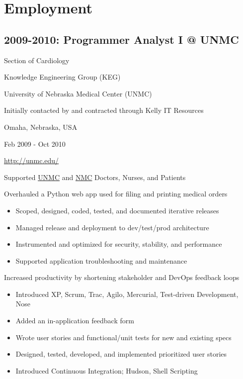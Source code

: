 \documentclass[letter,,openany,oneside]{sphinxhowto}
\begin{document}
\section{Employment}
\label{resume:employment}

\subsection{2009-2010: Programmer Analyst I @ UNMC}
\label{resume:programmer-analyst-i-unmc}
\begin{DUlineblock}{0em}
\item[] Section of Cardiology
\item[] Knowledge Engineering Group (KEG)
\item[] University of Nebraska Medical Center (UNMC)
\item[] Initially contacted by and contracted through Kelly IT Resources
\item[] Omaha, Nebraska, USA
\item[] Feb 2009 - Oct 2010
\item[] \url{http://unmc.edu/}
\end{DUlineblock}

Supported \href{https://en.wikipedia.org/wiki/University\_of\_Nebraska\_Medical\_Center}{UNMC}
and \href{https://en.wikipedia.org/wiki/Nebraska\_Medical\_Center}{NMC}
Doctors, Nurses, and Patients

Overhauled a Python web app used for filing and printing medical orders
\begin{itemize}
\item {} 
Scoped, designed, coded, tested, and documented iterative releases

\item {} 
Managed release and deployment to dev/test/prod architecture

\item {} 
Instrumented and optimized for security, stability, and performance

\item {} 
Supported application troubleshooting and maintenance

\end{itemize}

Increased productivity by shortening stakeholder and DevOps feedback loops
\begin{itemize}
\item {} 
Introduced XP, Scrum, Trac, Agilo, Mercurial, Test-driven Development, Nose

\item {} 
Added an in-application feedback form

\item {} 
Wrote user stories and functional/unit tests for new and existing specs

\item {} 
Designed, tested, developed, and implemented prioritized user stories

\item {} 
Introduced Continuous Integration; Hudson, Shell Scripting

\end{itemize}
\end{document}
